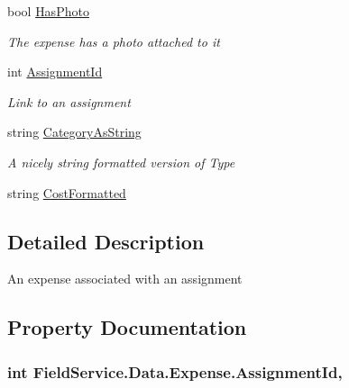 \begin{DoxyCompactItemize}
bool \hyperlink{class_field_service_1_1_data_1_1_expense_ab8f4a22623093af7fa54c2ac258a7eba}{Has\+Photo}
\begin{DoxyCompactList}\small\item\em The expense has a photo attached to it \end{DoxyCompactList}\item 
int \hyperlink{class_field_service_1_1_data_1_1_expense_a2747ec9bcbc585b28707ab9d52205f93}{Assignment\+Id}
\begin{DoxyCompactList}\small\item\em Link to an assignment \end{DoxyCompactList}\item 
string \hyperlink{class_field_service_1_1_data_1_1_expense_a25af4c85b63dfb53ef00e618c4967c4c}{Category\+As\+String}
\begin{DoxyCompactList}\small\item\em A nicely string formatted version of Type \end{DoxyCompactList}\item 
string \hyperlink{class_field_service_1_1_data_1_1_expense_a220b3abc26e29c0adc432df6ba9ff993}{Cost\+Formatted}
\end{DoxyCompactItemize}


\subsection{Detailed Description}
An expense associated with an assignment 



\subsection{Property Documentation}
\hypertarget{class_field_service_1_1_data_1_1_expense_a2747ec9bcbc585b28707ab9d52205f93}{
\subsubsection[{Assignment\+Id}]{\setlength{\rightskip}{0pt plus 5cm}int Field\+Service.\+Data.\+Expense.\+Assignment\+Id\hspace{0.3cm}{\ttfamily [get]}, {\ttfamily [set]}}}\label{class_field_service_1_1_data_1_1_expense_a2747ec9bcbc585b28707ab9d52205f93}


